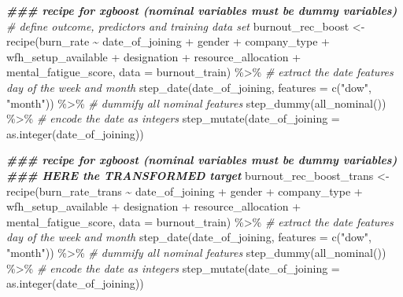 \documentclass[
]{book}
\newenvironment{Shaded}{\begin{snugshade}}{\end{snugshade}}
\newcommand{\AttributeTok}[1]{\textcolor[rgb]{0.77,0.63,0.00}{#1}}
\newcommand{\CommentTok}[1]{\textcolor[rgb]{0.56,0.35,0.01}{\textit{#1}}}
\newcommand{\DocumentationTok}[1]{\textcolor[rgb]{0.56,0.35,0.01}{\textbf{\textit{#1}}}}
\newcommand{\FunctionTok}[1]{\textcolor[rgb]{0.00,0.00,0.00}{#1}}
\newcommand{\NormalTok}[1]{#1}
\newcommand{\OtherTok}[1]{\textcolor[rgb]{0.56,0.35,0.01}{#1}}
\newcommand{\SpecialCharTok}[1]{\textcolor[rgb]{0.00,0.00,0.00}{#1}}
\newcommand{\StringTok}[1]{\textcolor[rgb]{0.31,0.60,0.02}{#1}}
\begin{document}
\begin{Shaded}
\begin{Highlighting}[]
\DocumentationTok{\#\#\# recipe for xgboost (nominal variables must be dummy variables)}
\CommentTok{\# define outcome, predictors and training data set}
\NormalTok{burnout\_rec\_boost }\OtherTok{\textless{}{-}} \FunctionTok{recipe}\NormalTok{(burn\_rate }\SpecialCharTok{\textasciitilde{}}\NormalTok{ date\_of\_joining }\SpecialCharTok{+}\NormalTok{ gender }\SpecialCharTok{+}
\NormalTok{                            company\_type }\SpecialCharTok{+}\NormalTok{ wfh\_setup\_available }\SpecialCharTok{+}
\NormalTok{                            designation }\SpecialCharTok{+}\NormalTok{ resource\_allocation }\SpecialCharTok{+}
\NormalTok{                            mental\_fatigue\_score,}
                            \AttributeTok{data =}\NormalTok{ burnout\_train) }\SpecialCharTok{\%\textgreater{}\%}
  \CommentTok{\# extract the date features day of the week and month}
  \FunctionTok{step\_date}\NormalTok{(date\_of\_joining, }\AttributeTok{features =} \FunctionTok{c}\NormalTok{(}\StringTok{"dow"}\NormalTok{, }\StringTok{"month"}\NormalTok{)) }\SpecialCharTok{\%\textgreater{}\%}
  \CommentTok{\# dummify all nominal features}
  \FunctionTok{step\_dummy}\NormalTok{(}\FunctionTok{all\_nominal}\NormalTok{()) }\SpecialCharTok{\%\textgreater{}\%}
  \CommentTok{\# encode the date as integers}
  \FunctionTok{step\_mutate}\NormalTok{(}\AttributeTok{date\_of\_joining =} \FunctionTok{as.integer}\NormalTok{(date\_of\_joining))}

\DocumentationTok{\#\#\# recipe for xgboost (nominal variables must be dummy variables)}
\DocumentationTok{\#\#\# HERE the TRANSFORMED target}
\NormalTok{burnout\_rec\_boost\_trans }\OtherTok{\textless{}{-}} \FunctionTok{recipe}\NormalTok{(burn\_rate\_trans }\SpecialCharTok{\textasciitilde{}}\NormalTok{ date\_of\_joining }\SpecialCharTok{+}\NormalTok{ gender }\SpecialCharTok{+}
\NormalTok{                            company\_type }\SpecialCharTok{+}\NormalTok{ wfh\_setup\_available }\SpecialCharTok{+}
\NormalTok{                            designation }\SpecialCharTok{+}\NormalTok{ resource\_allocation }\SpecialCharTok{+}
\NormalTok{                            mental\_fatigue\_score,}
                            \AttributeTok{data =}\NormalTok{ burnout\_train) }\SpecialCharTok{\%\textgreater{}\%}
  \CommentTok{\# extract the date features day of the week and month}
  \FunctionTok{step\_date}\NormalTok{(date\_of\_joining, }\AttributeTok{features =} \FunctionTok{c}\NormalTok{(}\StringTok{"dow"}\NormalTok{, }\StringTok{"month"}\NormalTok{)) }\SpecialCharTok{\%\textgreater{}\%}
  \CommentTok{\# dummify all nominal features}
  \FunctionTok{step\_dummy}\NormalTok{(}\FunctionTok{all\_nominal}\NormalTok{()) }\SpecialCharTok{\%\textgreater{}\%}
  \CommentTok{\# encode the date as integers}
  \FunctionTok{step\_mutate}\NormalTok{(}\AttributeTok{date\_of\_joining =} \FunctionTok{as.integer}\NormalTok{(date\_of\_joining))}


\end{Highlighting}
\end{Shaded}
\end{document}
